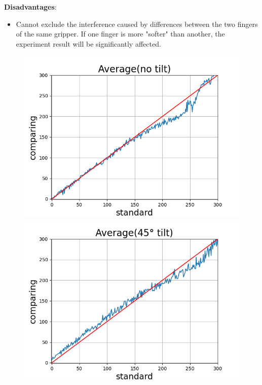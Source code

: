 \documentclass[conference]{IEEEtran}
\begin{document}
 \textbf{Disadvantages}:
  \begin{itemize}
     \item Cannot exclude the interference caused by differences between the two fingers of the same gripper. If one finger is more "softer" than another, the experiment result will be significantly affected.
 \end{itemize}


\begin{figure}[htbp]
  \centering
  \begin{minipage}[t]{0.32\textwidth}
    \centering
    \includegraphics[width=\textwidth]{pics/Section3/Average0.png}

  \end{minipage}
  \hfill
  \begin{minipage}[t]{0.32\textwidth}
    \centering
    \includegraphics[width=\textwidth]{pics/Section3/Average45.png }


\end{minipage}
\end{figure}
\end{document}
